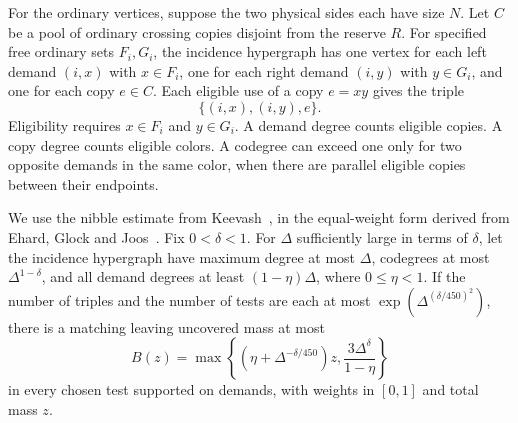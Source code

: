 For the ordinary vertices, suppose the two physical sides each have size \(N\). Let \(C\) be a pool of ordinary crossing copies disjoint from the reserve \(R\). For specified free ordinary sets \(F_i,G_i\), the incidence hypergraph has one vertex for each left demand \((i,x)\) with \(x\in F_i\), one for each right demand \((i,y)\) with \(y\in G_i\), and one for each copy \(e\in C\). Each eligible use of a copy \(e=xy\) gives the triple
\[
 \{(i,x),(i,y),e\}.
\]
Eligibility requires \(x\in F_i\) and \(y\in G_i\). A demand degree counts eligible copies. A copy degree counts eligible colors. A codegree can exceed one only for two opposite demands in the same color, when there are parallel eligible copies between their endpoints.

We use the nibble estimate from Keevash~\cite[Section~3.1]{KeevashII}, in the equal-weight form derived from Ehard, Glock and Joos~\cite{EGJ}. Fix \(0<\delta<1\). For \(\Delta\) sufficiently large in terms of \(\delta\), let the incidence hypergraph have maximum degree at most \(\Delta\), codegrees at most \(\Delta^{1-\delta}\), and all demand degrees at least \((1-\eta)\Delta\), where \(0\le\eta<1\). If the number of triples and the number of tests are each at most \(\exp(\Delta^{(\delta/450)^2})\), there is a matching leaving uncovered mass at most
\[
 B(z)=\max\left\{(\eta+\Delta^{-\delta/450})z,\frac{3\Delta^\delta}{1-\eta}\right\}
 \label{eq:nibble-error}\tag{N}
\]
in every chosen test supported on demands, with weights in \([0,1]\) and total mass \(z\).

